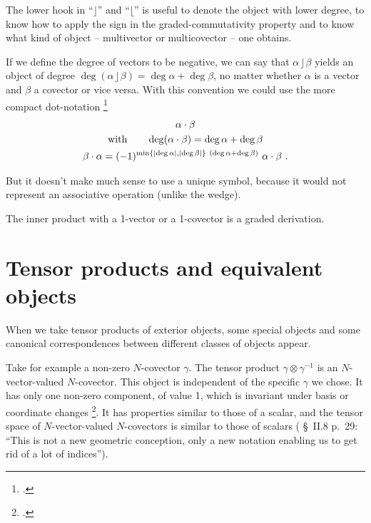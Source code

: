 \documentclass[\ifafour a4paper,12pt,\else a5paper,10pt,\fi%
onecolumn,oneside,article,%
british%
]{memoir}
\theoremstyle{remark}
\theoremstyle{innote}
\newcommand*{\citep}{\footcites}
\DeclarePairedDelimiter\abs{\lvert}{\rvert}
\DeclarePairedDelimiter\set{\{}{\}}
\renewcommand*{\|}[1][]{\nonscript\,#1\vert\nonscript\;\mathopen{}}
\newcommand*{\sect}{\S}%
\newcommand*{\cf}{{cf.}}
\newcommand*{\ii}{\mathbin{\rfloor}}
\newcommand*{\rii}{\mathbin{\lfloor}}
\begin{document}
The lower hook in \enquote{$\ii$} and \enquote{$\rii$} is useful to denote
the object with lower degree, to know how to apply the sign in the
graded-commutativity property and to know what kind of object --
multivector or multicovector -- one obtains.

If we define the degree of vectors to be negative, we can say that
$\alpha \ii \beta$ yields an object of degree
$\deg(\alpha\ii\beta)=\deg\alpha+\deg\beta$, no matter whether $\alpha$ is
a vector and $\beta$ a covector or vice versa. With this convention we
could use the more compact dot-notation
\citep[\cf][\sect~F.I.267]{truesdelletal1960}
\begin{equation}
  \label{eq:inner_dot}
  \begin{gathered}
    \alpha \cdot \beta
    \\
    \text{with}\qquad
    \deg(\alpha \cdot \beta) = \deg\alpha+\deg\beta
    \\
    \beta \cdot \alpha =
    (-1)^{\min\set{\abs{\deg \alpha},\abs{\deg\beta}}\ (\deg\alpha+\deg\beta)}\
    \alpha \cdot \beta \ .
\end{gathered}
\end{equation}

But it doesn't make much sense to use a unique symbol, because it would not
represent an associative operation (unlike the wedge).

The inner product with a 1-vector or a 1-covector is a graded derivation.

\section{Tensor products and equivalent objects}
\label{sec:tensor_equivalent}

When we take tensor products of exterior objects, some special objects and
some canonical correspondences between different classes of objects appear.

Take for example a non-zero $N$-covector $\gamma$. The tensor product
$\gamma \otimes \gamma^{-1}$ is an $N$-vector-valued $N$-covector. This
object is independent of the specific $\gamma$ we chose. It has only one
non-zero component, of value 1, which is invariant under basis or
coordinate changes \citep[\sect~II.8 p.~29 bottom]{schouten1951_r1989}. It
has properties similar to those of a scalar, and the tensor space of
$N$-vector-valued $N$-covectors is similar to those of scalars
(\textcite{schouten1951_r1989} \sect~II.8 p.~29: \enquote{This is not a new
  geometric conception, only a new notation enabling us to get rid of a lot
  of indices}).
\end{document}
